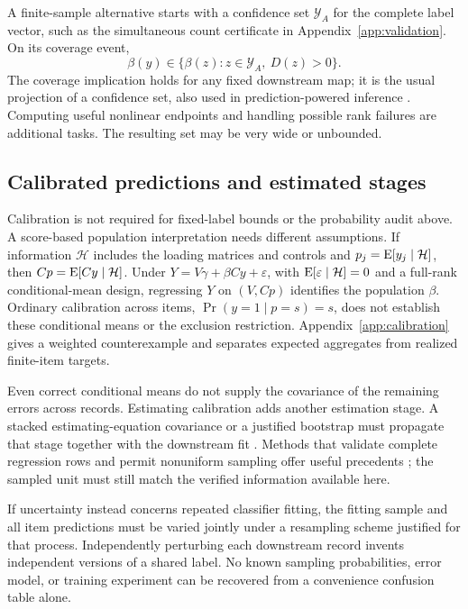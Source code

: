 A finite-sample alternative starts with a confidence set $\mathcal Y_A$
for the complete label vector, such as the simultaneous count certificate
in Appendix~\ref{app:validation}. On its coverage event,
\[
\beta(y)\in\{\beta(z):z\in\mathcal Y_A,\ D(z)>0\}.
\]
The coverage implication holds for any fixed downstream map; it is the
usual projection of a confidence set, also used in prediction-powered
inference \citep{angelopoulos2023ppi}. Computing useful nonlinear endpoints
and handling possible rank failures are additional tasks. The resulting
set may be very wide or unbounded.

\subsection{Calibrated predictions and estimated stages}\label{sec:calibration}
Calibration is not required for fixed-label bounds or the probability
audit above. A score-based population interpretation needs different
assumptions. If information $\mathcal H$ includes the loading matrices and
controls and $p_j=\operatorname{E}[y_j\mid\mathcal H]$, then
$Cp=\operatorname{E}[Cy\mid\mathcal H]$. Under
$Y=V\gamma+\beta Cy+\varepsilon$, with
$\operatorname{E}[\varepsilon\mid\mathcal H]=0$ and a full-rank conditional-mean design,
regressing $Y$ on $(V,Cp)$ identifies the population $\beta$.
Ordinary calibration across items, $\Pr(y=1\mid p=s)=s$, does not establish
these conditional means or the exclusion restriction. Appendix~\ref{app:calibration}
gives a weighted counterexample and separates expected aggregates from
realized finite-item targets.

Even correct conditional means do not supply the covariance of the
remaining errors across records. Estimating calibration adds another
estimation stage. A stacked estimating-equation covariance or a justified
bootstrap must propagate that stage together with the downstream fit
\citep{murphy1985twostep,boe2023calibration,boe2024sandwich}.
Methods that validate complete regression rows and permit nonuniform
sampling offer useful precedents \citep{kluger2025imputed}; the sampled
unit must still match the verified information available here.

If uncertainty instead concerns repeated classifier fitting, the fitting
sample and all item predictions must be varied jointly under a resampling
scheme justified for that process. Independently perturbing each downstream
record invents independent versions of a shared label. No known sampling
probabilities, error model, or training experiment can be recovered from a
convenience confusion table alone.

